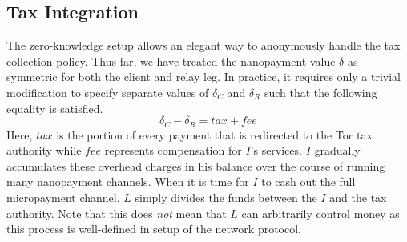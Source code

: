 
\subsection{Tax Integration}

The zero-knowledge setup allows an elegant way to anonymously handle the tax
collection policy. Thus far, we have treated the nanopayment value $\delta$ as
symmetric for both the client and relay leg. In practice, it requires only a
trivial modification to specify separate values of $\delta_C$ and $\delta_R$
such that the following equality is satisfied.
\begin{equation}
  \delta_C - \delta_R = tax + fee
  \label{eq:payment}
\end{equation}
Here, $tax$ is the portion of every payment that is redirected to the Tor tax
authority while $fee$ represents compensation for $I$'s services. $I$ gradually
accumulates these overhead charges in his balance over the course of running
many nanopayment channels. When it is time for $I$ to cash out the full
micropayment channel, $L$ simply divides the funds between the $I$ and the tax
authority. Note that this does \emph{not} mean that $L$ can arbitrarily control
money as this process is well-defined in setup of the network protocol.

